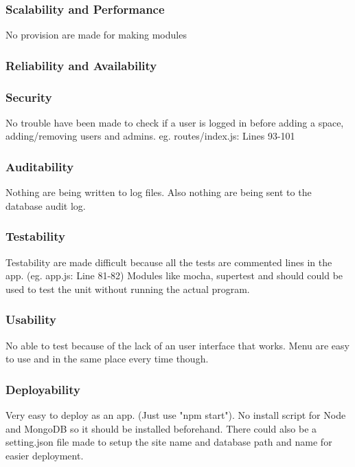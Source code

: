 \subsubsection{Scalability and Performance}

No provision are made for making modules 

\subsubsection{Reliability and Availability}

\subsubsection{Security}

No trouble have been made to check if a user is logged in before adding a space, adding/removing users and admins. eg. routes/index.js: Lines 93-101

\subsubsection{Auditability}

Nothing are being written to log files. Also nothing are being sent to the database audit log.

\subsubsection{Testability}

Testability are made difficult because all the tests are commented lines in the app. (eg. app.js: Line 81-82) Modules like mocha, supertest and should could be used to test the unit without running the actual program.

\subsubsection{Usability}

No able to test because of the lack of an user interface that works. Menu are easy to use and in the same place every time though.

\subsubsection{Deployability}

Very easy to deploy as an app. (Just use "npm start"). No install script for Node and MongoDB so it should be installed beforehand. There could also be a setting.json file made to setup the site name and database path and name for easier deployment.